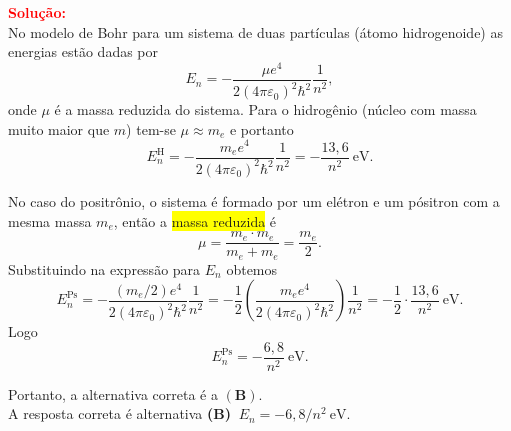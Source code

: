 \documentclass[a4paper,12pt]{article}
\begin{document}
\begin{flushleft}
\vspace{0.5cm}

\textcolor{red}{\textbf{Solução:}}\\

No modelo de Bohr para um sistema de duas partículas (átomo hidrogenoide) as energias estão dadas por
\[
E_n=-\frac{\mu e^4}{2(4\pi\varepsilon_0)^2\hbar^2}\frac{1}{n^2},
\]
onde \(\mu\) é a massa reduzida do sistema. Para o hidrogênio (núcleo com massa muito maior que \(m\)) tem-se \(\mu\approx m_e\) e portanto
\[
E_n^{\text{H}}=-\frac{m_e e^4}{2(4\pi\varepsilon_0)^2\hbar^2}\frac{1}{n^2}=-\frac{13{,}6}{n^2}\ \mathrm{eV}.
\]

No caso do positrônio, o sistema é formado por um elétron e um pósitron com a mesma massa \(m_e\), então a \colorbox{yellow}{massa reduzida} é
\[
\mu=\frac{m_e\cdot m_e}{m_e+m_e}=\frac{m_e}{2}.
\]
Substituindo na expressão para \(E_n\) obtemos
\[
E_n^{\text{Ps}}=-\frac{(m_e/2)e^4}{2(4\pi\varepsilon_0)^2\hbar^2}\frac{1}{n^2}
=-\frac{1}{2}\left(\frac{m_e e^4}{2(4\pi\varepsilon_0)^2\hbar^2}\right)\frac{1}{n^2}
=-\frac{1}{2}\cdot\frac{13{,}6}{n^2}\ \mathrm{eV}.
\]
Logo
\[
\boxed{
E_n^{\text{Ps}}=-\frac{6{,}8}{n^2}\ \mathrm{eV}}.
\]

Portanto, a alternativa correta é a \(\mathbf{(B)}\).\\

A resposta correta é alternativa \colorbox{green!50}{\textbf{(B)  \(\,E_n=-6{,}8/n^2\ \mathrm{eV}\)}}.
\end{flushleft}
\end{document}
